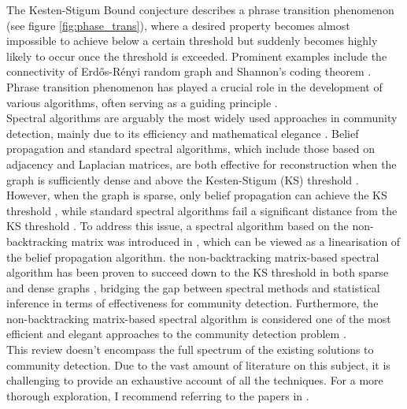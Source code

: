 The Kesten-Stigum Bound conjecture describes a phrase transition phenomenon (see figure \ref{fig:phase_trans}), where a desired property becomes almost impossible to achieve below a certain threshold but suddenly becomes highly likely to occur once the threshold is exceeded. Prominent examples include the connectivity of Erd\H{o}s-R\'{e}nyi random graph and Shannon's coding theorem \cite{shannon}. Phrase transition phenomenon has played a crucial role in the development of various algorithms, often serving as a guiding principle \cite{TheConjecture}.\\
Spectral algorithms are arguably the most widely used approaches in community detection, mainly due to its efficiency and mathematical elegance \cite{spectral_algo_review}. Belief propagation and standard spectral algorithms, which include those based on adjacency and Laplacian matrices, are both effective for reconstruction when the graph is sufficiently dense and above the Kesten-Stigum (KS) threshold \cite{standard_spec_in_dense}. However, when the graph is sparse, only belief propagation can achieve the KS threshold \cite{firstpaper}, while standard spectral algorithms fail a significant distance from the KS threshold \cite{standard_spec_fail}. To address this issue, a spectral algorithm based on the non-backtracking matrix was introduced in \cite{the_non-backtracking}, which can be viewed as a linearisation of the belief propagation algorithm\cite{as15c}. the non-backtracking matrix-based spectral algorithm  has been proven to succeed down to the KS threshold in both sparse and dense graphs  \cite{blm15}, bridging the gap between spectral methods and statistical inference in terms of effectiveness for community detection. Furthermore, the non-backtracking matrix-based spectral algorithm is considered one of the most efficient and elegant approaches to the community detection problem \cite{the_non-backtracking} \cite{TheConjecture}.\\
This review doesn't encompass the full spectrum of the existing solutions to community detection. Due to the vast amount of literature on this subject, it is challenging to provide an exhaustive account of all the techniques. For a more thorough exploration, I recommend referring to the papers in \cite{TheConjecture} \cite{comm_dete_in_graphs} \cite{userguide} \cite{dallamico:tel-03454227}.

